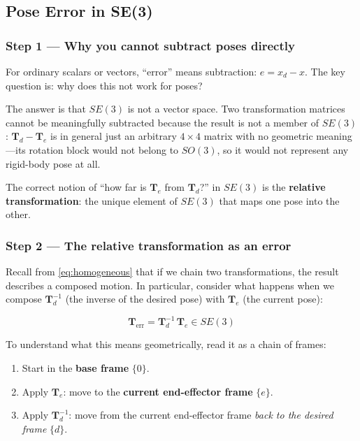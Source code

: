 \subsection{Pose Error in SE(3)}
\label{subsec:pose_error}

\subsubsection*{Step 1 --- Why you cannot subtract poses directly}

For ordinary scalars or vectors, ``error'' means subtraction:
$e = x_d - x$.
The key question is: why does this not work for poses?

The answer is that $SE(3)$ is not a vector space.
Two transformation matrices cannot be meaningfully subtracted because
the result is not a member of $SE(3)$:
$\mathbf{T}_d - \mathbf{T}_e$ is in general just an arbitrary $4\times4$
matrix with no geometric meaning---its rotation block would not belong
to $SO(3)$, so it would not represent any rigid-body pose at all.

The correct notion of ``how far is $\mathbf{T}_e$ from $\mathbf{T}_d$?''
in $SE(3)$ is the \textbf{relative transformation}: the unique element
of $SE(3)$ that maps one pose into the other.

\subsubsection*{Step 2 --- The relative transformation as an error}

Recall from \cref{eq:homogeneous} that if we chain two transformations,
the result describes a composed motion.
In particular, consider what happens when we compose $\mathbf{T}_d^{-1}$
(the inverse of the desired pose) with $\mathbf{T}_e$ (the current pose):

\begin{equation}
\label{eq:T_error}
\mathbf{T}_{\mathrm{err}} = \mathbf{T}_d^{-1}\,\mathbf{T}_e \in SE(3)
\end{equation}

To understand what this means geometrically, read it as a chain of frames:

\begin{enumerate}
  \item Start in the \textbf{base frame} $\{0\}$.
  \item Apply $\mathbf{T}_e$: move to the \textbf{current
        end-effector frame} $\{e\}$.
  \item Apply $\mathbf{T}_d^{-1}$: move from the current end-effector
        frame \emph{back to the desired frame} $\{d\}$.
\end{enumerate}

